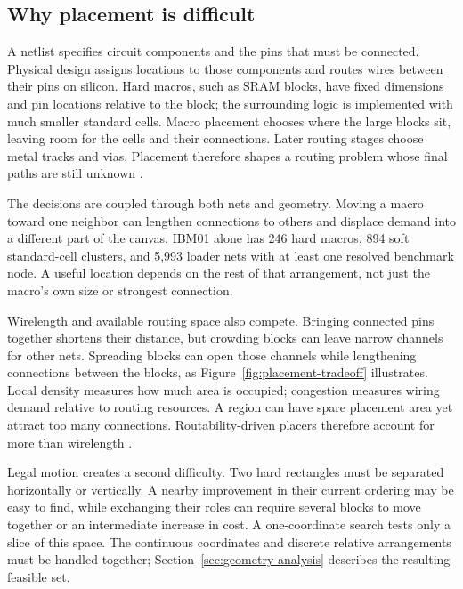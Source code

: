 \subsection{Why placement is difficult}\label{sec:background}

A netlist specifies circuit components and the pins that must be connected.
Physical design assigns locations to those components and routes wires between
their pins on silicon. Hard macros, such
as SRAM blocks, have fixed dimensions and pin locations relative to the block;
the surrounding logic is implemented with much smaller standard cells. Macro
placement chooses where the large blocks sit, leaving room for the cells and
their connections. Later routing stages choose metal tracks and vias. Placement
therefore shapes a routing problem whose final paths are still unknown
\citep{openroadflow}.

The decisions are coupled through both nets and geometry. Moving a macro toward
one neighbor can lengthen connections to others and displace demand into a
different part of the canvas. IBM01 alone has 246 hard macros,
894 soft standard-cell clusters, and 5,993 loader nets with at least one resolved
benchmark node. A useful
location depends on the rest of that arrangement, not just the macro's own size
or strongest connection.

Wirelength and available routing space also compete. Bringing connected pins
together shortens their distance, but crowding blocks can leave narrow channels
for other nets. Spreading blocks can open those channels while lengthening
connections between the blocks, as Figure~\ref{fig:placement-tradeoff}
illustrates. Local density measures how much area is occupied; congestion
measures wiring demand relative to routing resources. A region can have spare
placement area yet attract too many connections. Routability-driven placers
therefore account for more than wirelength \citep{cheng2019replace,openroadmacro}.

Legal motion creates a second difficulty. Two hard rectangles must be separated
horizontally or vertically. A nearby improvement in their current ordering may
be easy to find, while exchanging their roles can require several blocks to move
together or an intermediate increase in cost. A one-coordinate search tests
only a slice of this space. The continuous coordinates and discrete relative
arrangements must be handled together; Section~\ref{sec:geometry-analysis}
describes the resulting feasible set.

